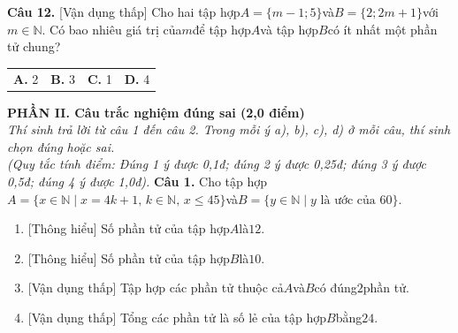 \documentclass[11pt,a4paper]{article}
\begin{document}
\noindent\textbf{Câu 12.} [Vận dụng thấp] Cho hai tập hợp$A = \{m - 1; 5\}$và$B = \{2; 2m + 1\}$với$m \in \mathbb{N}$. Có bao nhiêu giá trị của$m$để tập hợp$A$và tập hợp$B$có ít nhất một phần tử chung?\par\vspace{2pt}
\noindent\begin{tabular*}{\textwidth}{@{\extracolsep{\fill}}llll@{}}
\textbf{A.} 2 & \textbf{B.} 3 & \textbf{C.} 1 & \textbf{D.} 4
\end{tabular*}\par\vspace{5pt}


\vspace{6pt}
\noindent
\textbf{\large PHẦN II. Câu trắc nghiệm đúng sai (2,0 điểm)}\\
\textit{\small Thí sinh trả lời từ câu 1 đến câu 2. Trong mỗi ý a), b), c), d) ở mỗi câu, thí sinh chọn đúng hoặc sai.}\\
\textit{\small (Quy tắc tính điểm: Đúng 1 ý được 0,1đ; đúng 2 ý được 0,25đ; đúng 3 ý được 0,5đ; đúng 4 ý được 1,0đ).}
\vspace{6pt}
\noindent\textbf{Câu 1.} Cho tập hợp$A = \{x \in \mathbb{N} \mid x = 4k + 1,\, k \in \mathbb{N},\, x \le 45\}$và$B = \{y \in \mathbb{N} \mid y \text{ là ước của } 60\}$.\par\vspace{2pt}
\begin{enumerate}[label=\textbf{\alph*)}, leftmargin=1.2cm, itemsep=2pt, topsep=2pt]
  \item \textnormal{[Thông hiểu]} Số phần tử của tập hợp$A$là$12$.
  \item \textnormal{[Thông hiểu]} Số phần tử của tập hợp$B$là$10$.
  \item \textnormal{[Vận dụng thấp]} Tập hợp các phần tử thuộc cả$A$và$B$có đúng$2$phần tử.
  \item \textnormal{[Vận dụng thấp]} Tổng các phần tử là số lẻ của tập hợp$B$bằng$24$.
\end{enumerate}
\vspace{6pt}
\end{document}
